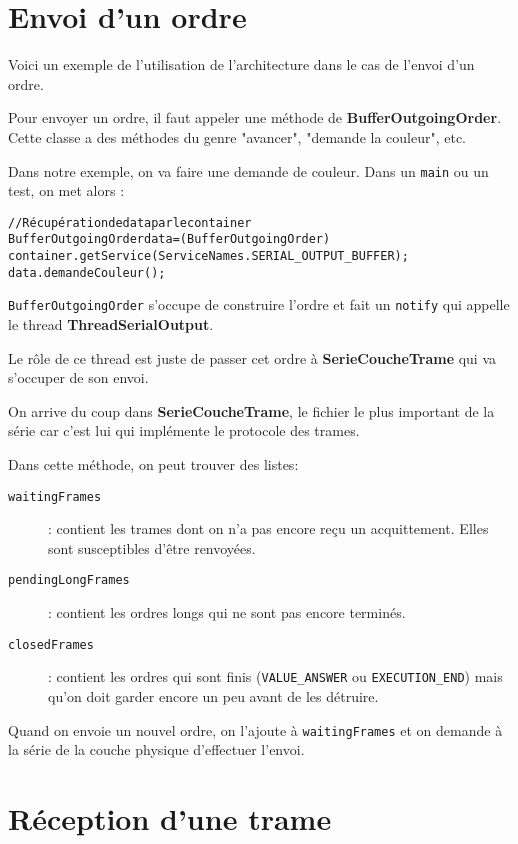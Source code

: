 \documentclass[a4paper, 12pt]{article}
\begin{document}
\section{Envoi d'un ordre}

Voici un exemple de l'utilisation de l'architecture dans le cas de l'envoi d'un ordre.

Pour envoyer un ordre, il faut appeler une méthode de \textbf{BufferOutgoingOrder}. Cette classe a des méthodes du genre "avancer", "demande la couleur", etc.

Dans notre exemple, on va faire une demande de couleur. Dans un \texttt{main} ou un test, on met alors :

\begin{alltt}
// Récupération de data par le container
BufferOutgoingOrder data = (BufferOutgoingOrder)
      container.getService(ServiceNames.SERIAL_OUTPUT_BUFFER);
data.demandeCouleur();
\end{alltt}

\texttt{BufferOutgoingOrder} s'occupe de construire l'ordre et fait un \texttt{notify} qui appelle le thread \textbf{ThreadSerialOutput}.

Le rôle de ce thread est juste de passer cet ordre à \textbf{SerieCoucheTrame} qui va s'occuper de son envoi.

On arrive du coup dans \textbf{SerieCoucheTrame}, le fichier le plus important de la série car c'est lui qui implémente le protocole des trames.

Dans cette méthode, on peut trouver des listes:

\begin{description}
\item[\texttt{waitingFrames}] : contient les trames dont on n'a pas encore reçu un acquittement. Elles sont susceptibles d'être renvoyées.
\item[\texttt{pendingLongFrames}] : contient les ordres longs qui ne sont pas encore terminés.
\item[\texttt{closedFrames}] : contient les ordres qui sont finis (\texttt{VALUE\_ANSWER} ou \texttt{EXECUTION\_END}) mais qu'on doit garder encore un peu avant de les détruire.
\end{description}

Quand on envoie un nouvel ordre, on l'ajoute à \texttt{waitingFrames} et on demande à la série de la couche physique d'effectuer l'envoi.

\section{Réception d'une trame}
\end{document}
